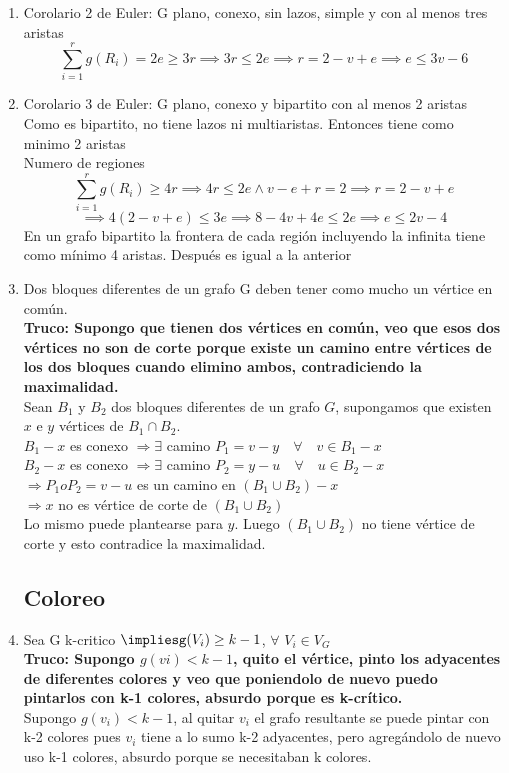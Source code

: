 \documentclass{article}
\begin{document}
\begin{enumerate}
    \item Corolario 2 de Euler: G plano, conexo, sin lazos, simple y con al menos tres aristas
    $$\sum_{i=1}^rg(R_i)=2e\geq 3r \implies 3r\leq 2e \implies r = 2-v+e\implies e\leq 3v-6$$
    
    \item Corolario 3 de Euler: G plano, conexo y bipartito con al menos 2 aristas \\
    Como es bipartito, no tiene lazos ni multiaristas. Entonces tiene como minimo 2 aristas\\
    Numero de regiones
    $$\sum_{i=1}^rg(R_i)\geq4r\implies4r\leq2e\land v-e+r=2 \implies r=2-v+e$$
    $$\implies 4(2-v+e)\leq3e\implies 8-4v+4e\leq 2e\implies e\leq 2v-4$$
    En un grafo bipartito la frontera de cada región incluyendo la infinita
    tiene como mínimo 4 aristas. Después es igual a la anterior

    \item Dos bloques diferentes de un grafo G deben tener como mucho un vértice en común. \\
    \textbf{Truco: Supongo que tienen dos vértices en común, veo que esos dos vértices no son de corte porque existe un camino entre vértices de los dos bloques cuando elimino ambos, contradiciendo la maximalidad.} \\
    Sean $B_{1}$ y $B_{2}$ dos bloques diferentes de un grafo $G$, supongamos que existen $x$ e $y$ vértices de $B_{1} \cap B_{2}$.\\ $B_{1}-x$ es conexo $\Rightarrow \exists$ camino $P_{1}=v-y \quad \forall \quad v \in B_{1}-x$ \\
    $B_{2}-x$ es conexo $\Rightarrow \exists$ camino $P_{2}=y-u \quad \forall \quad u \in B_{2}-x$ \\
    $\Rightarrow P_{1} o P_{2}=v-u$ es un camino en $\left(B_{1} \cup B_{2}\right)-x$ \\
    $\Rightarrow x$ no es vértice de corte de $\left(B_{1} \cup B_{2}\right)$ \\
    Lo mismo puede plantearse para $y$. Luego $\left(B_{1} \cup B_{2}\right)$ no tiene vértice de corte $\mathrm{y}$ esto contradice la maximalidad.
    
\subsection{Coloreo}
    \item Sea G k-critico $\impliesg(V_i)\geq k-1$, $\forall$ $V_i\in V_G$ \\
    \textbf{Truco: Supongo $g(vi)<k-1$, quito el vértice, pinto los adyacentes de diferentes colores y veo que poniendolo de nuevo puedo pintarlos con k-1 colores, absurdo porque es k-crítico.} \\
    Supongo $g(v_i)<k-1$, al quitar $v_i$ el grafo resultante se puede pintar con k-2 colores pues $v_i$ tiene a lo sumo k-2 adyacentes, pero agregándolo de nuevo uso k-1 colores, absurdo porque se necesitaban k colores.
    

\end{enumerate}
\end{document}
